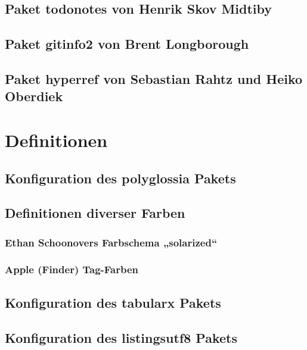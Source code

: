 \documentclass[a4paper,12pt]{article}
\begin{document}
			\section{Paket todonotes von Henrik Skov Midtiby}
				
			\section{Paket gitinfo2 von Brent Longborough}
				
			\section{Paket hyperref von Sebastian Rahtz und Heiko Oberdiek}
				
		\chapter{Definitionen}
			\section{Konfiguration des polyglossia Pakets}
				
			\section{Definitionen diverser Farben}
				\subsection{Ethan Schoonovers Farbschema „solarized“}
					
				\subsection{Apple (Finder) Tag-Farben}
					
			\section{Konfiguration des tabularx Pakets}
				
			\section{Konfiguration des listingsutf8 Pakets}
				

		
\end{document}
